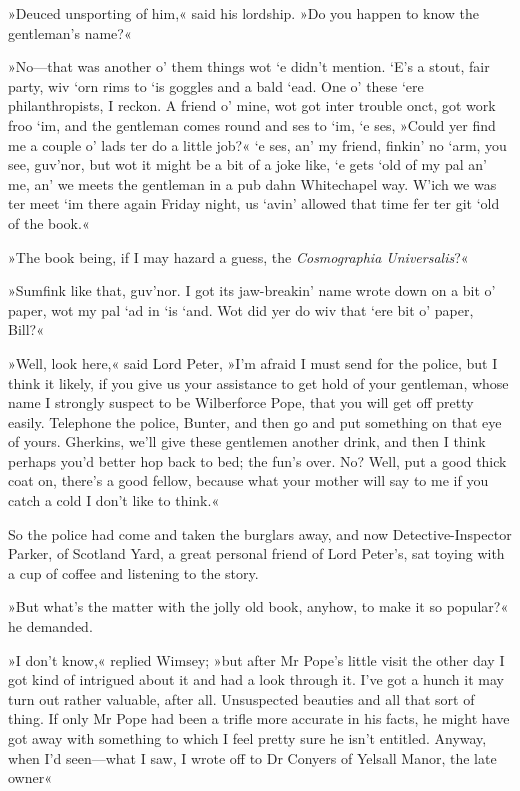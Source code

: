 »Deuced unsporting of him,« said his lordship. »Do you happen to know the gentleman's name?«

»No—that was another o' them things wot `e didn't mention. `E's a stout, fair party, wiv `orn rims to `is goggles and a bald `ead. One o' these `ere philanthropists, I reckon. A friend o' mine, wot got inter trouble onct, got work froo `im, and the gentleman comes round and ses to `im, `e ses, »Could yer find me a couple o' lads ter do a little job?« `e ses, an' my friend, finkin' no `arm, you see, guv'nor, but wot it might be a bit of a joke like, `e gets `old of my pal an' me, an' we meets the gentleman in a pub dahn Whitechapel way. W'ich we was ter meet `im there again Friday night, us `avin' allowed that time fer ter git `old of the book.«

»The book being, if I may hazard a guess, the \textit{Cosmographia Universalis}?«

»Sumfink like that, guv'nor. I got its jaw-breakin' name wrote down on a bit o' paper, wot my pal `ad in `is `and. Wot did yer do wiv that `ere bit o' paper, Bill?«

»Well, look here,« said Lord Peter, »I'm afraid I must send for the police, but I think it likely, if you give us your assistance to get hold of your gentleman, whose name I strongly suspect to be Wilberforce Pope, that you will get off pretty easily. Telephone the police, Bunter, and then go and put something on that eye of yours. Gherkins, we'll give these gentlemen another drink, and then I think perhaps you'd better hop back to bed; the fun's over. No? Well, put a good thick coat on, there's a good fellow, because what your mother will say to me if you catch a cold I don't like to think.«

So the police had come and taken the burglars away, and now Detective-Inspector Parker, of Scotland Yard, a great personal friend of Lord Peter's, sat toying with a cup of coffee and listening to the story.

»But what's the matter with the jolly old book, anyhow, to make it so popular?« he demanded.

»I don't know,« replied Wimsey; »but after Mr Pope's little visit the other day I got kind of intrigued about it and had a look through it. I've got a hunch it may turn out rather valuable, after all. Unsuspected beauties and all that sort of thing. If only Mr Pope had been a trifle more accurate in his facts, he might have got away with something to which I feel pretty sure he isn't entitled. Anyway, when I'd seen—what I saw, I wrote off to Dr Conyers of Yelsall Manor, the late owner\longdash«

